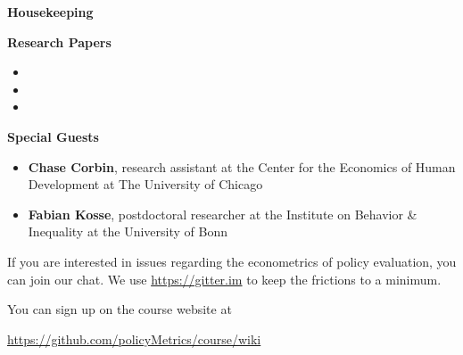 \begin{frame}\begin{center}
\LARGE\textbf{Housekeeping}
\end{center}\end{frame}
\begin{frame}\textbf{Research Papers}

\begin{itemize}\setlength\itemsep{0.5em}
\item {}
\item {}
\item {}
\end{itemize}

\end{frame}
\begin{frame}\textbf{Special Guests}

\begin{itemize}\setlength\itemsep{0.5em}
\item \textbf{Chase Corbin}, research assistant at the Center for the Economics of Human Development at The University of Chicago
\item \textbf{Fabian Kosse}, postdoctoral researcher at the Institute on Behavior \& Inequality at the University of Bonn
\end{itemize}
\end{frame}
\begin{frame}
If you are interested in issues regarding the econometrics of policy evaluation, you can join our chat. We use \href{gitter.im}{https://gitter.im} to keep the frictions to a minimum.\\\vspace{0.3cm}

You can sign up on the course website at

\begin{center}
\url{https://github.com/policyMetrics/course/wiki}
\end{center}
\end{frame}
